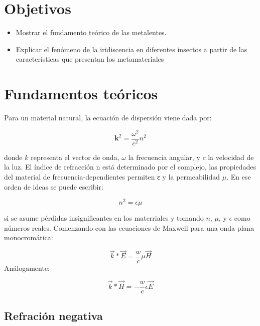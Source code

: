 \documentclass[a4paper, twocolumn, 10pt]{article}
\begin{document}
\section*{Objetivos}

\begin{itemize}
    \item Mostrar el fundamento teórico de las metalentes.
    \item Explicar el fenómeno de la iridiscencia en diferentes insectos a partir de las características que presentan los metamateriales
\end{itemize}

\section*{Fundamentos teóricos}


Para un material natural, la ecuación de dispersión viene dada por:

\begin{equation}
    \textbf{k}^2 = \frac{\omega^2}{c^2}n^2
\end{equation}

donde $k$ representa el vector de onda, $\omega$ la frecuencia angular, y $c$ la velocidad de la luz. El índice de refracción n está determinado por el complejo, las propiedades del material de frecuencia-dependientes permiten ε y la permeabilidad $\mu$.
En ese orden de ideas se puede escribir:

\begin{equation}
    n^2 = \epsilon\mu
\end{equation}

si se asume pérdidas insignificantes en los materriales y tomando $n$, $\mu$, y $\epsilon$ como números reales. Comenzando con las ecuaciones de Maxwell para una onda plana monocromática:

\begin{equation}
    \vec{k}*\vec{E} = \frac{w}{c}\mu\vec{H}
\end{equation}
Análogamente:


\begin{equation}
    \vec{k}*\vec{H} =- \frac{w}{c}\epsilon\vec{E}
\end{equation}



\subsection*{Refración negativa}
\end{document}
